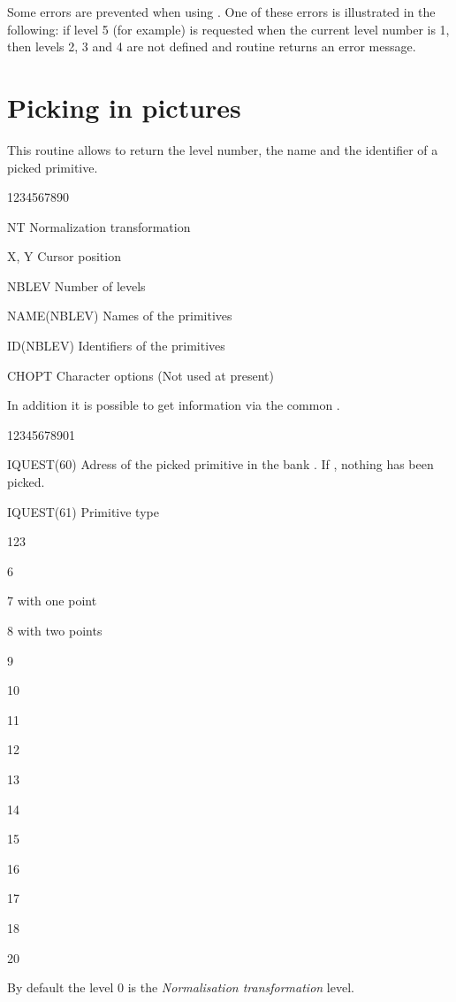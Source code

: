 Some errors are prevented when using . One of these
errors is illustrated in the following:
if level 5 (for example) is requested when
the current level number is 1, then levels 2, 3 and 4
are not defined and  routine  returns an error message.


\section{Picking in \HIGZ{} pictures}
\Action
This routine allows to return the level number, the name and the
identifier of a picked primitive.
\Pdesc
\begin{DLtt}{1234567890}
   \item[NT] Normalization transformation
   \item[X, Y] Cursor position
   \item[NBLEV] Number of levels
   \item[NAME(NBLEV)] Names of the primitives
   \item[ID(NBLEV)] Identifiers of the primitives
   \item[CHOPT] Character options (Not used at present)
\end{DLtt}
In addition it is possible to get information via the common \QUEST.
\begin{DLtt}{12345678901}
   \item[IQUEST(60)] Adress of the picked primitive in the bank . 
               If , nothing has been picked.
   \item[IQUEST(61)] Primitive type
   \begin{DLtt}{123}
      \item[6] 
      \item[7]  with one point
      \item[8]  with two points
      \item[9] 
      \item[10] 
      \item[11] 
      \item[12] 
      \item[13] 
      \item[14] 
      \item[15] 
      \item[16] 
      \item[17] 
      \item[18] 
      \item[20] 
   \end{DLtt}
\end{DLtt}
\par
By default the level 0 is the {\it Normalisation transformation} level.

